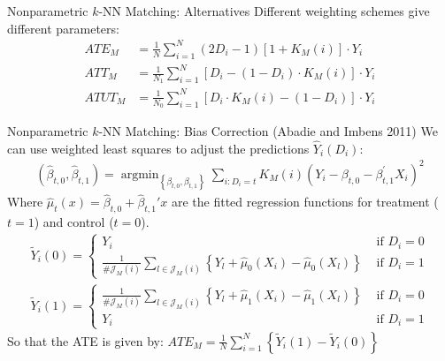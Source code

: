 \documentclass[aspectratio=169,11pt]{beamer}
\begin{document}
\begin{frame}{Nonparametric $k$-NN Matching: Alternatives}
Different weighting schemes give different parameters:
\begin{align*}
ATE_M&=\frac{1}{N} \sum_{i=1}^{N} \left(2 D_{i}-1\right)\left[1+K_{M}(i)\right] \cdot Y_{i} \\
ATT_M&=\frac{1}{N_1}\sum_{i=1}^{N} \left[D_{i}-(1-D_i) \cdot K_{M}(i)\right] \cdot  Y_{i}\\
ATUT_M&=\frac{1}{N_0}\sum_{i=1}^{N} \left[D_{i}\cdot K_{M}(i) -(1-D_i) \right] \cdot Y_{i}
\end{align*}
\end{frame}



\begin{frame}{Nonparametric $k$-NN Matching: Bias Correction (Abadie and Imbens 2011)}
We can use weighted least squares to adjust the predictions $\hat{Y}_i(D_i)$:
\begin{align*}
\left(\widehat{\beta}_{t, 0}, \widehat{\beta}_{t, 1}\right)=\operatorname{argmin}_{\left\{\beta_{t, 0}, \beta_{t, 1}\right\}} \sum_{i: D_{i}=t} K_{M}(i)\left(Y_{i}-\beta_{t, 0}-\beta_{t, 1}^{\prime} X_{i}\right)^{2}
\end{align*}
Where $\widehat{\mu}_t(x)=\widehat{\beta}_{t,0}+\widehat{\beta}_{t,1}'x$ are the fitted regression functions for treatment ($t=1$) and control ($t=0$).
\begin{align*}
\tilde{Y}_{i}(0)=\left\{\begin{array}{cc}
Y_{i} & \text { if } D_{i}=0 \\
\frac{1}{\# \mathcal{J}_{M}(i)} \sum_{l \in \mathcal{J}_{M}(i)}\left\{Y_{l}+\widehat{\mu}_{0}\left(X_{i}\right)-\widehat{\mu}_{0}\left(X_{l}\right)\right\} & \text { if } D_{i}=1
\end{array}\right. \\
\tilde{Y}_{i}(1)=\left\{\begin{array}{cc}
\frac{1}{\# \mathcal{J}_{M}(i)} \sum_{l \in \mathcal{J}_{M}(i)}\left\{Y_{l}+\widehat{\mu}_{1}\left(X_{i}\right)-\widehat{\mu}_{1}\left(X_{l}\right)\right\} & \text { if } D_{i}=0 \\
Y_{i} & \text { if } D_{i}=1
\end{array}\right.
\end{align*}
So that the ATE is given by: $ATE_M=\frac{1}{N} \sum_{i=1}^{N}\left\{\tilde{Y}_{i}(1)-\tilde{Y}_{i}(0)\right\}$
\end{frame}
\end{document}
